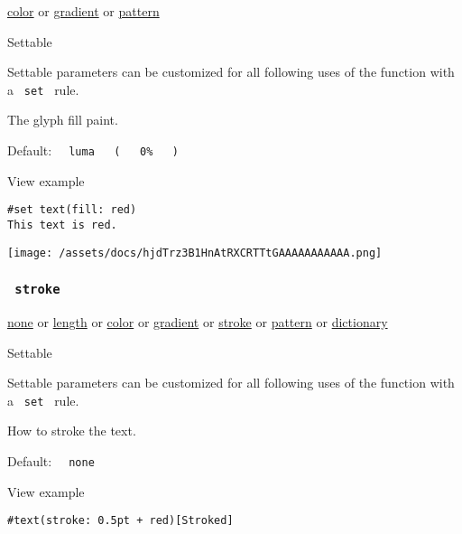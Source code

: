 \href{/docs/reference/visualize/color/}{color} {or}
\href{/docs/reference/visualize/gradient/}{gradient} {or}
\href{/docs/reference/visualize/pattern/}{pattern}

{{ Settable }}

\label{parameters-fill-settable-tooltip}
Settable parameters can be customized for all following uses of the
function with a \texttt{\ set\ } rule.

The glyph fill paint.

Default:
\texttt{\ }{\texttt{\ luma\ }}\texttt{\ }{\texttt{\ (\ }}\texttt{\ }{\texttt{\ 0\%\ }}\texttt{\ }{\texttt{\ )\ }}\texttt{\ }


View example

\begin{verbatim}
#set text(fill: red)
This text is red.
\end{verbatim}

\texttt{[image: /assets/docs/hjdTrz3B1HnAtRXCRTTtGAAAAAAAAAAA.png]}

\subsubsection{\texorpdfstring{\texttt{\ stroke\ }}{ stroke }}\label{parameters-stroke}

\href{/docs/reference/foundations/none/}{none} {or}
\href{/docs/reference/layout/length/}{length} {or}
\href{/docs/reference/visualize/color/}{color} {or}
\href{/docs/reference/visualize/gradient/}{gradient} {or}
\href{/docs/reference/visualize/stroke/}{stroke} {or}
\href{/docs/reference/visualize/pattern/}{pattern} {or}
\href{/docs/reference/foundations/dictionary/}{dictionary}

{{ Settable }}

\label{parameters-stroke-settable-tooltip}
Settable parameters can be customized for all following uses of the
function with a \texttt{\ set\ } rule.

How to stroke the text.

Default: \texttt{\ }{\texttt{\ none\ }}\texttt{\ }


View example

\begin{verbatim}
#text(stroke: 0.5pt + red)[Stroked]
\end{verbatim}

